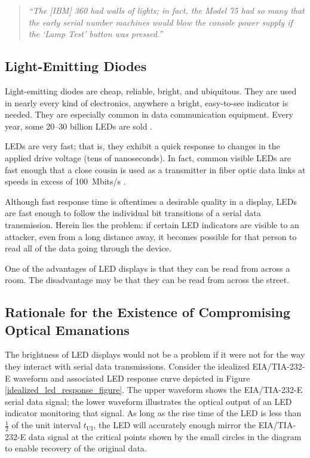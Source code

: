 \documentclass{acmtrans2e}
\begin{document}
\begin{quote}
\emph{``The [IBM] 360 had walls of lights; in fact, the Model 75 had so
many that the early serial number machines would blow the console power 
supply if the `Lamp Test' button was pressed.''} \cite{morris}
\end{quote}

\subsection{Light-Emitting Diodes}

Light-emitting diodes are cheap, reliable, bright, and ubiquitous.  They 
are used in nearly every kind of electronics, anywhere a bright, 
easy-to-see indicator is needed.  They are especially common in
data communication equipment.  Every year, some 
20--30 billion LEDs are sold \cite{led_shipments}.

LEDs are very fast; that is, they exhibit a quick response to 
changes in the applied drive voltage (tens of nanoseconds).  In fact,
common visible LEDs
are fast enough that a close cousin is used as a transmitter in fiber
optic data links at speeds in excess of 100~Mbits/s
\cite{hp_fiber_optic_data_sheet}.

Although fast response time is oftentimes a desirable quality in a 
display, LEDs are fast enough to follow the individual bit transitions 
of a serial data transmission.  Herein lies the problem: if certain LED 
indicators are visible to an attacker, even from a long distance away,
it becomes possible for that person to read all of the data going through the 
device.

One of the advantages of LED displays is that they can be read from 
across a room.  The disadvantage may be that they can be read from across 
the street.

\subsection{Rationale for the Existence of Compromising Optical 
Emanations}

The brightness of LED displays would not be a problem if it were not for 
the way they interact with serial data transmissions.  Consider the
idealized EIA/TIA-232-E waveform and associated LED response curve depicted in
Figure \ref{idealized_led_response_figure}.  The upper waveform shows
the EIA/TIA-232-E serial data signal; the lower waveform illustrates
the optical output of an LED indicator monitoring that signal.  As long
as the rise time of
the LED is less than $\frac{1}{2}$ of the unit interval $t_\mathrm{UI}$,
the LED will accurately enough mirror the EIA/TIA-232-E data signal at the
critical points shown by the small circles in the diagram to enable recovery
of the original data.
\end{document}
